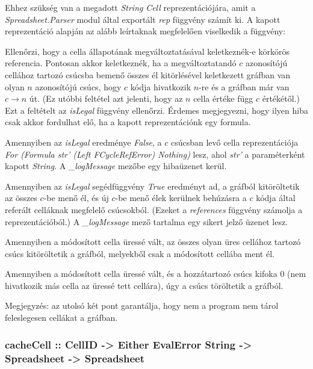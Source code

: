 Ehhez szükség van a megadott \textit{String} \textit{Cell} reprezentációjára, amit a \textit{Spreadsheet.Parser} modul által exportált \textit{rep} függvény számít ki. A kapott reprezentáció alapján az alább leírtaknak megfelelően viselkedik a függvény:

\begin{compactenum}
	\item Ellenőrzi, hogy a cella állapotának megváltoztatásával keletkeznék-e 		körkörös referencia. Pontosan akkor keletkeznék, ha a megváltoztatandó $c$ 	azonosítójú cellához tartozó csúcsba bemenő összes él kitörlésével keletkezett gráfban van olyan $n$ azonosítójú csúcs, hogy $c$ kódja hivatkozik $n$-re és a gráfban már van $c \rightarrow n$ út. (Ez utóbbi feltétel azt jelenti, hogy az $n$ cella értéke függ $c$ értékétől.) Ezt a feltételt az \textit{isLegal} függvény ellenőrzi. Érdemes megjegyezni, hogy ilyen hiba csak akkor fordulhat elő, ha a kapott reprezentációnk egy formula.
	\item Amennyiben az \textit{isLegal} eredménye \textit{False}, a $c$ csúcsban levő cella reprezentációja \textit{For (Formula str' (Left FCycleRefError) Nothing)} lesz, ahol \textit{str'} a paraméterként kapott \textit{String}. A \textit{\_logMessage} mezőbe egy hibaüzenet kerül.
	\item Amennyiben az \textit{isLegal} segédfüggvény \textit{True} eredményt ad, a gráfból kitöröltetik az összes $c$-be menő él, és új $c$-be menő élek kerülnek behúzásra a $c$ kódja által referált celláknak megfelelő csúcsokból. (Ezeket a \textit{references} függvény számolja a reprezentációból.) A \textit{\_logMessage} mező tartalma egy sikert jelző üzenet lesz.
	\item Amennyiben a módosított cella üressé vált, az összes olyan üres cellához tartozó csúcs kitöröltetik a gráfból, melyekből csak a módosított cellába ment él.
	\item Amennyiben a módosított cella üressé vált, és a hozzátartozó csúcs kifoka 0 (nem hivatkozik más cella az üressé tett cellára), úgy a csúcs töröltetik a gráfból.
\end{compactenum}

Megjegyzés: az utolsó két pont garantálja, hogy nem a program nem tárol feleslegesen cellákat a gráfban.

\subsubsection{cacheCell :: CellID -> Either EvalError String -> Spreadsheet -> Spreadsheet}

